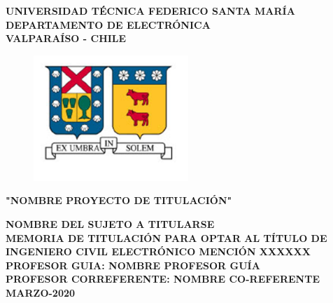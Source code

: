\documentclass[../../main.tex]{subfiles}
\begin{document}
	\thispagestyle{empty}
	
	\begin{center}
		\linespread{1.15}
		\textbf{\large{UNIVERSIDAD TÉCNICA FEDERICO SANTA MARÍA\\}
			\normalsize{DEPARTAMENTO DE ELECTRÓNICA\\VALPARAÍSO - CHILE\\}}
		
		\vspace{0.5cm}
		\begin{figure}[H]
			\centering
			\includegraphics[width=5.85cm]{fig/usmLogo.png}
		\end{figure}
		\vspace{0.5cm}
		
		\linespread{1}\hangindent=0cm
		\textbf{\Large "NOMBRE PROYECTO DE TITULACIÓN"\\}
		\vspace{3cm}
		
		\hangindent=0cm\large \textbf{NOMBRE DEL SUJETO A TITULARSE}\\
		\vspace{0.5cm}
		\hangindent=0cm\normalsize \textbf{MEMORIA DE TITULACIÓN PARA OPTAR AL TÍTULO DE INGENIERO CIVIL ELECTRÓNICO MENCIÓN XXXXXX}\\
		\vspace{1cm}
		\hangindent=0cm\normalsize \textbf{PROFESOR GUIA: \hspace{2cm} NOMBRE PROFESOR GUÍA}\\
		\vspace{0.5cm}
		\hangindent=0cm\normalsize \textbf{PROFESOR CORREFERENTE: \hspace{2cm} NOMBRE CO-REFERENTE}\\
		\vspace{0.5cm}
		\hangindent=0cm\large \textbf{MARZO-2020}\\
		
	\end{center}
	
	\thispagestyle{empty}
	\newpage
\end{document}

